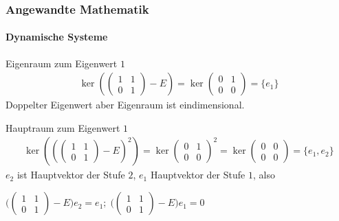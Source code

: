 \documentclass{beamer}
\begin{document}
 \begin{frame}
    \frametitle{Angewandte Mathematik}
\framesubtitle{Dynamische Systeme }
\begin{block}{Eigenraum zum Eigenwert $1$}
    \begin{align*}
    \ker (\begin{pmatrix}
        1 & 1  \\ 0 & 1
    \end{pmatrix} - E) = 
    \ker \begin{pmatrix}
        0 & 1  \\ 0 & 0  
    \end{pmatrix} = \{e_1\}
\end{align*}
Doppelter Eigenwert aber Eigenraum ist eindimensional. 
 \end{block}
 \begin{block}{Hauptraum zum Eigenwert $1$}
    \begin{align*}
    \ker ( (\begin{pmatrix}
        1 & 1  \\ 0 & 1
    \end{pmatrix} - E)^2) = 
    \ker \begin{pmatrix}
        0 & 1  \\ 0 & 0  
    \end{pmatrix}^2 = \ker \begin{pmatrix}
        0 & 0  \\ 0 & 0  
    \end{pmatrix} =  \{e_1, e_2\}
\end{align*}
$e_2$ ist Hauptvektor der Stufe $2$, $e_1$ Hauptvektor der Stufe $1$, also

$ \biggl (\begin{pmatrix}
    1 & 1  \\ 0 & 1
\end{pmatrix} - E \biggr) e_2 = e_1; \;  \biggl (\begin{pmatrix}
    1 & 1  \\ 0 & 1
\end{pmatrix} - E \biggr) e_1 = 0$ 
 \end{block}
 \end{frame}
\end{document}
